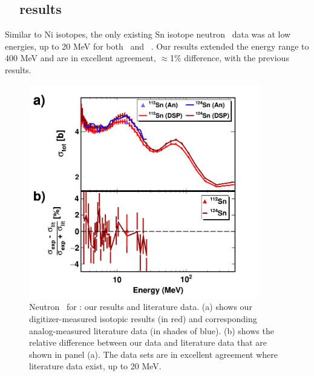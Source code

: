 \subsection{\snTwelveFour\ \tot\ results}
Similar to Ni isotopes, the only existing Sn isotope neutron \tot\ data was at
low energies, up to 20 MeV for both \snTwelve\ and \snFour\ \cite{Harper1982, Timokhov1989, 
Rapaport1980, Dukarevich1967}. Our results extended the energy range to 400 MeV and are
in excellent agreement, $\approx$1\% difference, with the previous results.
\begin{figure}[ht!]
    \centering
    \includegraphics[width=0.9\textwidth]{figures/TwoPanelSn.png}
    \caption[Neutron \tot\ for \snTwelveFour: our results and literature data]
    {
        Neutron \tot\ for \snTwelveFour: our results and literature data.
        (a) shows our digitizer-measured isotopic results (in red) and
        corresponding analog-measured literature data \cite{Harper1982, Timokhov1989, 
        Rapaport1980, Dukarevich1967} (in shades of blue).
        (b) shows the relative difference between our data
        and literature data that are shown in panel (a). The data sets are in
        excellent agreement where literature data exist, up to 20 MeV.
    }
    \label{TwoPanelSn}
\end{figure}
